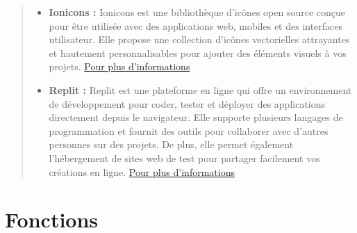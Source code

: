 \documentclass{article}
\begin{document}
\begin{quote}
\begin{itemize}
        \vspace*{1\baselineskip}
        \item \textbf{Ionicons   : } 
        Ionicons est une bibliothèque d'icônes open source conçue pour être utilisée avec des applications web, mobiles et des interfaces utilisateur. 
        Elle propose une collection d'icônes vectorielles attrayantes et hautement personnalisables pour ajouter des éléments visuels à vos projets. \href{https://ionic.io/ionicons}{Pour plus d'informations}
        \vspace*{1\baselineskip}
        \item \textbf{Replit   : } 
        Replit est une plateforme en ligne qui offre un environnement de développement pour coder, tester et déployer des applications directement depuis le navigateur. Elle supporte plusieurs langages de programmation et fournit des outils pour collaborer avec d'autres personnes sur des projets. 
        De plus, elle permet également l'hébergement de sites web de test pour partager facilement vos créations en ligne. \href{https://replit.com/}{Pour plus d'informations}
    \end{itemize}
\end{quote}

\newpage
{}
\section*{Fonctions}
\label{sec:partieFonctions}
\end{document}
